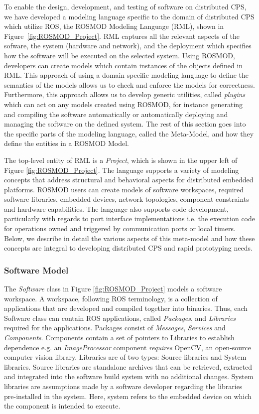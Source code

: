To enable the design, development, and testing of software on
distributed CPS, we have developed a modeling language specific to the
domain of distributed CPS which utilize ROS, the ROSMOD Modeling
Language (RML), shown in Figure~\ref{fig:ROSMOD_Project}.  RML
captures all the relevant aspects of the sofware, the system (hardware
and network), and the deployment which specifies how the software will
be executed on the selected system.  Using ROSMOD, developers can
create models which contain instances of the objects defined in RML.
This approach of using a domain specific modeling language to define
the semantics of the models allows us to check and enforce the models
for correctness.  Furthermore, this approach allows us to develop
generic utilities, called \emph{plugins} which can act on any models
created using ROSMOD, for instance generating and compiling the software
automatically or automatically deploying and managing the software on
the defined system.  The rest of this section goes into the specific
parts of the modeling language, called the Meta-Model, and how they
define the entities in a ROSMOD Model.

The top-level entity of RML is a \emph{Project}, which is shown in the
upper left of Figure \ref{fig:ROSMOD_Project}.  The language supports
a variety of modeling concepts that address structural and behavioral
aspects for distributed embedded platforms. ROSMOD users can create
models of software workspaces, required software libraries, embedded
devices, network topologies, component constraints and hardware
capabilities. The language also supports code development,
particularly with regards to port interface implementations i.e. the
execution code for operations owned and triggered by communication
ports or local timers. Below, we describe in detail the various
aspects of this meta-model and how these concepts are integral to
developing distributed CPS and rapid prototyping needs.

\subsubsection{Software Model}

The \emph{Software} class in Figure \ref{fig:ROSMOD_Project} models a
software workspace. A workspace, following ROS terminology, is a
collection of applications that are developed and compiled together
into binaries. Thus, each Software class can contain ROS applications,
called \emph{Packages}, and \emph{Libraries} required for the
applications. Packages consist of \emph{Messages}, \emph{Services} and
\emph{Components}. Components contain a set of pointers to Libraries
to establish dependence e.g. an \emph{ImageProcessor} component
\emph{requires} OpenCV, an open-source computer vision
library. Libraries are of two types: Source libraries and System
libraries. Source libraries are standalone archives that can be
retrieved, extracted and integrated into the software build system
with no additional changes. System libraries are assumptions made by a
software developer regarding the libraries pre-installed in the
system. Here, system refers to the embedded device on which the
component is intended to execute.


